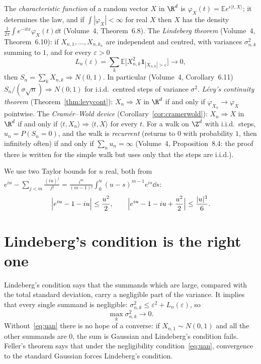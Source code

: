\begin{reminder}
The \emph{characteristic function} of a random vector $X$ in $\R^d$ is $\varphi_X(t)=\mathbb E e^{i\langle t,X\rangle}$; it determines the law, and if
$\int|\varphi_X|<\infty$ for real $X$ then $X$ has the density $\frac1{2\pi}\int e^{-itx}\varphi_X(t)\dd t$ (Volume~4, Theorem~6.8). The \emph{Lindeberg
theorem} (Volume~4, Theorem~6.10): if $X_{n,1},\dots,X_{n,k_n}$ are independent and centred, with variances $\sigma_{n,k}^2$ summing to $1$, and for
every $\varepsilon>0$
\[
L_n(\varepsilon)=\sum_k\mathbb E\bigl[X_{n,k}^2\mathbf 1_{|X_{n,k}|>\varepsilon}\bigr]\to0,
\]
then $S_n=\sum_kX_{n,k}\Rightarrow N(0,1)$. In particular (Volume~4, Corollary~6.11) $S_n/(\sigma\sqrt n)\Rightarrow N(0,1)$ for i.i.d.\ centred steps of
variance $\sigma^2$. \emph{L\'evy's continuity theorem} (Theorem~\ref{thm:levycont}): $X_n\Rightarrow X$ in $\R^d$ if and only if
$\varphi_{X_n}\to\varphi_X$ pointwise. The \emph{Cram\'er--Wold device} (Corollary~\ref{cor:cramerwold}): $X_n\Rightarrow X$ in $\R^d$ if and
only if $\langle t,X_n\rangle\Rightarrow\langle t,X\rangle$ for every $t$. For a walk on $\Z^d$ with i.i.d.\ steps, $u_n=P(S_n=0)$, and the walk is
\emph{recurrent} (returns to $0$ with probability $1$, then infinitely often) if and only if $\sum_nu_n=\infty$ (Volume~4, Proposition~8.4: the proof
there is written for the simple walk but uses only that the steps are i.i.d.).
\end{reminder}

We use two Taylor bounds for $u$ real, both from $e^{iu}-\sum_{j<m}\frac{(iu)^j}{j!}=\frac{i^m}{(m-1)!}\int_0^u(u-s)^{m-1}e^{is}\dd s$:
\begin{equation}\label{eq:taylor}
\Bigl|e^{iu}-1-iu\Bigr|\le\frac{u^2}2,\qquad\Bigl|e^{iu}-1-iu+\frac{u^2}2\Bigr|\le\frac{|u|^3}6.
\end{equation}

\section{Lindeberg's condition is the right one}

Lindeberg's condition says that the summands which are large, compared with the total standard deviation, carry a negligible part of the variance.
It implies that every single summand is negligible: $\sigma_{n,k}^2\le\varepsilon^2+L_n(\varepsilon)$, so
\begin{equation}\label{eq:uan}
\max_k\sigma_{n,k}^2\to0.
\end{equation}
Without~\eqref{eq:uan} there is no hope of a converse: if $X_{n,1}\sim N(0,1)$ and all the other summands are $0$, the sum is Gaussian and Lindeberg's
condition fails. Feller's theorem says that under the negligibility condition~\eqref{eq:uan}, convergence to the standard Gaussian forces Lindeberg's condition.

